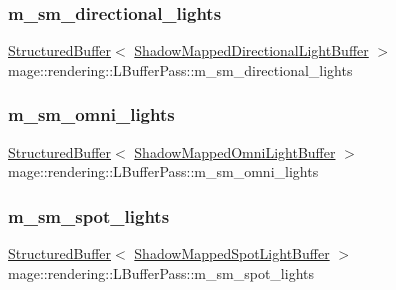 \subsubsection{\texorpdfstring{m\+\_\+sm\+\_\+directional\+\_\+lights}{m\_sm\_directional\_lights}}
{\footnotesize\ttfamily \hyperlink{classmage_1_1rendering_1_1_structured_buffer}{Structured\+Buffer}$<$ \hyperlink{structmage_1_1rendering_1_1_shadow_mapped_directional_light_buffer}{Shadow\+Mapped\+Directional\+Light\+Buffer} $>$ mage\+::rendering\+::\+L\+Buffer\+Pass\+::m\+\_\+sm\+\_\+directional\+\_\+lights\hspace{0.3cm}{\ttfamily [private]}}

\hypertarget{classmage_1_1rendering_1_1_l_buffer_pass_a3f32431790f55b3959713ae44c1847f9}{}\label{classmage_1_1rendering_1_1_l_buffer_pass_a3f32431790f55b3959713ae44c1847f9} 
\subsubsection{\texorpdfstring{m\+\_\+sm\+\_\+omni\+\_\+lights}{m\_sm\_omni\_lights}}
{\footnotesize\ttfamily \hyperlink{classmage_1_1rendering_1_1_structured_buffer}{Structured\+Buffer}$<$ \hyperlink{structmage_1_1rendering_1_1_shadow_mapped_omni_light_buffer}{Shadow\+Mapped\+Omni\+Light\+Buffer} $>$ mage\+::rendering\+::\+L\+Buffer\+Pass\+::m\+\_\+sm\+\_\+omni\+\_\+lights\hspace{0.3cm}{\ttfamily [private]}}

\hypertarget{classmage_1_1rendering_1_1_l_buffer_pass_aea554100305b5a5b198cfd579999fe8a}{}\label{classmage_1_1rendering_1_1_l_buffer_pass_aea554100305b5a5b198cfd579999fe8a} 
\subsubsection{\texorpdfstring{m\+\_\+sm\+\_\+spot\+\_\+lights}{m\_sm\_spot\_lights}}
{\footnotesize\ttfamily \hyperlink{classmage_1_1rendering_1_1_structured_buffer}{Structured\+Buffer}$<$ \hyperlink{structmage_1_1rendering_1_1_shadow_mapped_spot_light_buffer}{Shadow\+Mapped\+Spot\+Light\+Buffer} $>$ mage\+::rendering\+::\+L\+Buffer\+Pass\+::m\+\_\+sm\+\_\+spot\+\_\+lights\hspace{0.3cm}{\ttfamily [private]}}

